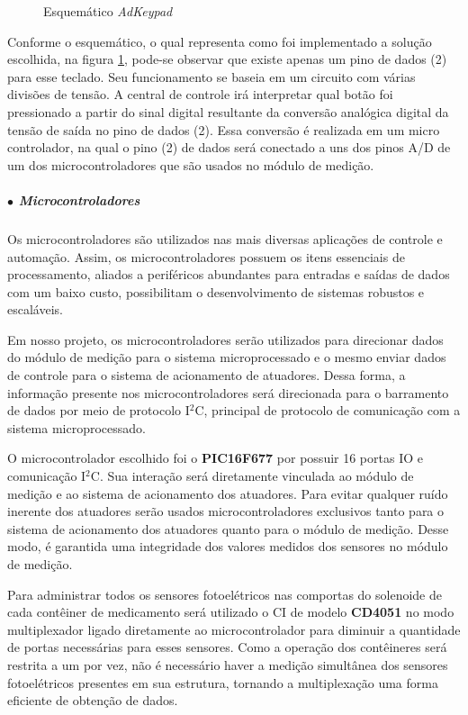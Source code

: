 \begin{figure}[H]
\begin{minipage}[b]{0.3\textwidth}
            \caption{Esquemático \textit{AdKeypad}}
            \label{fig:keypad_esq}
          \end{minipage}
        \end{figure}
        
        Conforme o esquemático, o qual representa como foi implementado a solução escolhida, na figura \ref{fig:keypad_esq}, pode-se observar que existe apenas um pino de dados (2) para esse teclado. Seu funcionamento se baseia em um circuito com várias divisões de tensão. A central de controle irá interpretar qual botão foi pressionado a partir do sinal digital resultante da conversão analógica digital da tensão de saída no pino de dados (2). Essa conversão é realizada em um micro controlador, na qual o pino (2) de dados será conectado a uns dos pinos A/D de um dos microcontroladores que são usados no módulo de medição. 
    
    \subparagraph*{$\bullet$ Microcontroladores} \hfill
    
    Os microcontroladores são utilizados nas mais diversas aplicações de controle e automação. Assim, os microcontroladores possuem os itens essenciais de processamento, aliados a periféricos abundantes para entradas e saídas de dados com um  baixo custo, possibilitam o desenvolvimento de sistemas robustos e escaláveis.
    
    Em nosso projeto, os microcontroladores serão utilizados para direcionar dados do módulo de medição para o sistema microprocessado e o mesmo enviar dados de controle para o sistema de acionamento de atuadores. Dessa forma, a informação presente nos microcontroladores será direcionada para o barramento de dados por meio de protocolo I$^2$C, principal de protocolo de comunicação com a sistema microprocessado.
    
    O microcontrolador escolhido foi o \textbf{PIC16F677} por possuir 16 portas IO e comunicação I$^2$C. Sua interação será diretamente vinculada ao módulo de medição e ao sistema de acionamento dos atuadores. Para evitar qualquer ruído inerente dos atuadores serão usados microcontroladores exclusivos tanto para o sistema de acionamento dos atuadores quanto para o módulo de medição. Desse modo, é garantida uma integridade dos valores medidos dos sensores no módulo de medição.
    
    Para administrar todos os sensores fotoelétricos nas comportas do solenoide de cada contêiner de medicamento será utilizado o CI de modelo \textbf{CD4051} no modo multiplexador ligado diretamente ao microcontrolador para diminuir a quantidade de portas necessárias para esses sensores. Como a operação dos contêineres será restrita a um por vez, não é necessário haver a medição simultânea dos sensores fotoelétricos presentes em sua estrutura, tornando a multiplexação uma forma eficiente de obtenção de dados.
    
